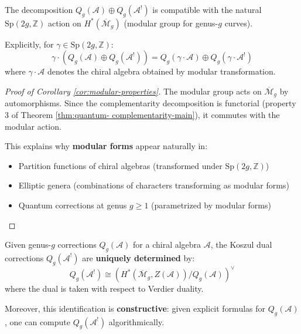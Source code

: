 \begin{corollary}
\label{cor:modular-properties}
The decomposition $Q_g(\mathcal{A}) \oplus Q_g(\mathcal{A}^!)$ is compatible with the 
natural $\text{Sp}(2g, \mathbb{Z})$ action on $H^*(\overline{\mathcal{M}}_g)$ (modular 
group for genus-$g$ curves).

Explicitly, for $\gamma \in \text{Sp}(2g, \mathbb{Z})$:
\begin{equation}
\gamma \cdot (Q_g(\mathcal{A}) \oplus Q_g(\mathcal{A}^!)) = Q_g(\gamma \cdot \mathcal{A}) 
\oplus Q_g(\gamma \cdot \mathcal{A}^!)
\end{equation}
where $\gamma \cdot \mathcal{A}$ denotes the chiral algebra obtained by modular 
transformation.
\end{corollary}

\begin{proof}[Proof of Corollary \ref{cor:modular-properties}]
The modular group acts on $\overline{\mathcal{M}}_g$ by automorphisms. Since the 
complementarity decomposition is functorial (property 3 of Theorem \ref{thm:quantum-
complementarity-main}), it commutes with the modular action.

This explains why \textbf{modular forms} appear naturally in:
\begin{itemize}
\item Partition functions of chiral algebras (transformed under $\text{Sp}(2g, 
\mathbb{Z})$)
\item Elliptic genera (combinations of characters transforming as modular forms)
\item Quantum corrections at genus $g \geq 1$ (parametrized by modular forms)
\end{itemize}
\end{proof}

\begin{corollary}
\label{cor:uniqueness-quantum}
Given genus-$g$ corrections $Q_g(\mathcal{A})$ for a chiral algebra $\mathcal{A}$, the 
Koszul dual corrections $Q_g(\mathcal{A}^!)$ are \textbf{uniquely determined} by:
\begin{equation}
Q_g(\mathcal{A}^!) \cong \left(H^*(\overline{\mathcal{M}}_g, Z(\mathcal{A})) / Q_g(
\mathcal{A})\right)^\vee
\end{equation}
where the dual is taken with respect to Verdier duality.

Moreover, this identification is \textbf{constructive}: given explicit formulas for 
$Q_g(\mathcal{A})$, one can compute $Q_g(\mathcal{A}^!)$ algorithmically.
\end{corollary}

